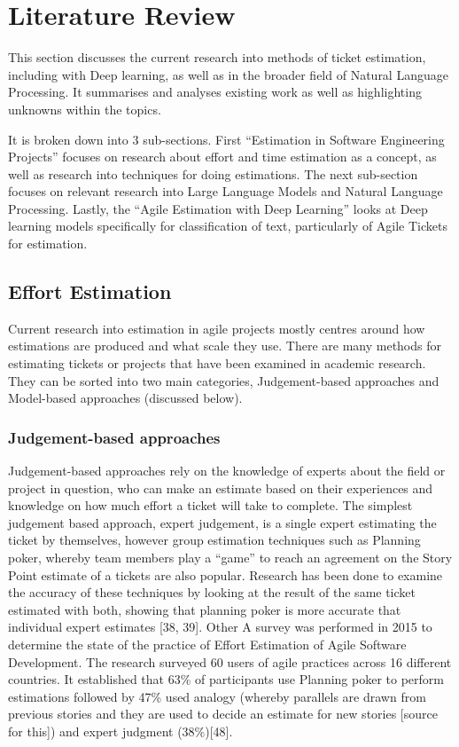 \documentclass{UoYCSproject}
\begin{document}
    \chapter{Literature Review}
    \label{ch:literature-review}
    This section discusses the current research into methods of ticket estimation, including with Deep learning, as well as in the broader field of Natural Language Processing.
    It summarises and analyses existing work as well as highlighting unknowns within the topics.

    It is broken down into 3 sub-sections.
    First “Estimation in Software Engineering Projects” focuses on research about effort and time estimation as a concept, as well as research into techniques for doing estimations.
    The next sub-section focuses on relevant research into Large Language Models and Natural Language Processing.
    Lastly, the “Agile Estimation with Deep Learning” looks at Deep learning models specifically for classification of text, particularly of Agile Tickets for estimation.


    \section{Effort Estimation}
    \label{sec:effort-estimation}
    Current research into estimation in agile projects mostly centres around how estimations are produced and what scale they use.
    There are many methods for estimating tickets or projects that have been examined in academic research.
    They can be sorted into two main categories, Judgement-based approaches and Model-based approaches (discussed below).

    \subsection{Judgement-based approaches}
    \label{subsec:judgement-based-approaches}

    Judgement-based approaches rely on the knowledge of experts about the field or project in question, who can make an estimate based on their experiences and knowledge on how much effort a ticket will take to complete.
    The simplest judgement based approach, expert judgement, is a single expert estimating the ticket by themselves, however group estimation techniques such as Planning poker, whereby team members play a “game” to reach an agreement on the Story Point estimate of a tickets are also popular.
    Research has been done to examine the accuracy of these techniques by looking at the result of the same ticket estimated with both, showing that planning poker is more accurate that individual expert estimates [38, 39]. Other
    A survey was performed in 2015 to determine the state of the practice of Effort Estimation of Agile Software Development.
    The research surveyed 60 users of agile practices across 16 different countries. It established that 63\% of participants use Planning poker to perform estimations followed by 47\% used analogy (whereby parallels are drawn from previous stories and they are used to decide an estimate for new stories [source for this]) and expert judgment (38\%)[48].
\end{document}
